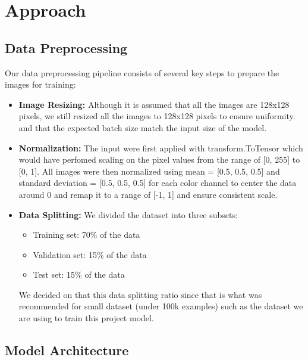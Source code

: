 \documentclass[10pt]{article}
\begin{document}
\section{Approach}

\subsection{Data Preprocessing}

Our data preprocessing pipeline consists of several key steps to prepare the images for training:

\begin{itemize}
    \item \textbf{Image Resizing:} Although it is assumed that all the images are 128x128 pixels, we still resized all the images to 128x128 pixels to ensure uniformity.
    and that the expected batch size match the input size of the model.
    
    \item \textbf{Normalization:} The input were first applied with transform.ToTensor which would have perfomed scaling on the pixel values from the range of [0, 255] to [0, 1]. 
    All images were then normalized using mean = [0.5, 0.5, 0.5] and standard deviation = [0.5, 0.5, 0.5] for each color channel to center the data around 0 and remap it to a range of 
    [-1, 1] and ensure consistent scale.
    
    \item \textbf{Data Splitting:} We divided the dataset into three subsets:
    \begin{itemize}
        \item Training set: 70\% of the data
        \item Validation set: 15\% of the data
        \item Test set: 15\% of the data
    \end{itemize}
    We decided on that this data splitting ratio since that is what was recommended for small dataset (under 100k examples) such as the dataset we are using to train this project model.
\end{itemize}

\subsection{Model Architecture}
\end{document}
